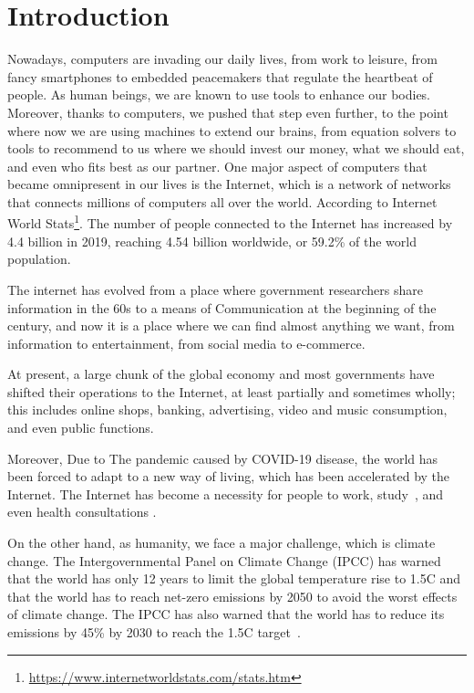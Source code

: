 \chapter{Introduction}
\label{chapter:introduction}

Nowadays, computers are invading our daily lives, from work to leisure, from fancy smartphones to embedded peacemakers that regulate the heartbeat of people.
As human beings, we are known to use tools to enhance our bodies. Moreover, thanks to computers, we pushed that step even further, to the point where now we are using machines to extend our brains, from equation solvers to tools to recommend to us where we should invest our money, what we should eat, and even who fits best as our partner.
One major aspect of computers that became omnipresent in our lives is the Internet, which is a network of networks that connects millions of computers all over the world. According to Internet World Stats\footnote{\url{https://www.internetworldstats.com/stats.htm}}. The number of people connected to the Internet has increased by 4.4 billion in 2019, reaching 4.54 billion worldwide, or 59.2\% of the world population.

The internet has evolved from a place where government researchers share information in the 60s to a means of Communication at the beginning of the century, and now it is a place where we can find almost anything we want, from information to entertainment, from social media to e-commerce.

At present, a large chunk of the global economy and most governments have shifted their operations to the Internet, at least partially and sometimes wholly; this includes online shops, banking, advertising, video and music consumption, and even public functions. 

Moreover, Due to The pandemic caused by COVID-19 disease, the world has been forced to adapt to a new way of living, which has been accelerated by the Internet. The Internet has become a necessity for people to work, study~\cite{naresh2020education}, and even health consultations \cite{liaw2021primary}.

On the other hand, as humanity, we face a major challenge, which is climate change. The Intergovernmental Panel on Climate Change (IPCC) has warned that the world has only 12 years to limit the global temperature rise to 1.5\degree C and that the world has to reach net-zero emissions by 2050 to avoid the worst effects of climate change. The IPCC has also warned that the world has to reduce its emissions by 45\% by 2030 to reach the 1.5\degree C target~\cite{portner2022climate}.

